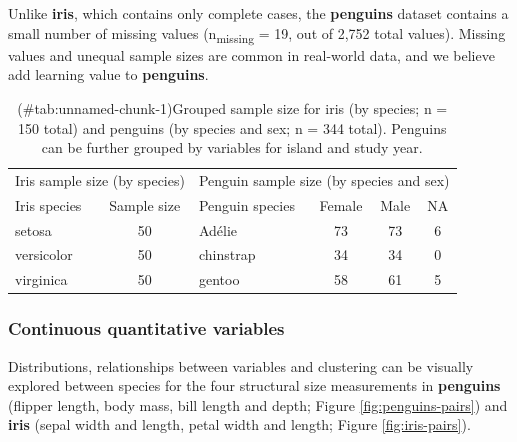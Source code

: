 Unlike \textbf{iris}, which contains only complete cases, the \textbf{penguins} dataset contains a small number of missing values (n\textsubscript{missing} = 19, out of 2,752 total values). Missing values and unequal sample sizes are common in real-world data, and we believe add learning value to \textbf{penguins}.

\begin{Schunk}
\begin{table}

\caption{(\#tab:unnamed-chunk-1)Grouped sample size for iris (by species; n = 150 total) and penguins (by species and sex; n = 344 total). Penguins can be further grouped by variables for island and study year.}
\centering
\begin{tabular}[t]{l|c|l|c|c|c}
\hline
\multicolumn{2}{c|}{Iris sample size (by species)} & \multicolumn{4}{c}{Penguin sample size (by species and sex)} \\
\cline{1-2} \cline{3-6}
Iris species & Sample size & Penguin species & Female & Male & NA\\
\hline
setosa & 50 & Adélie & 73 & 73 & 6\\
\hline
versicolor & 50 & chinstrap & 34 & 34 & 0\\
\hline
virginica & 50 & gentoo & 58 & 61 & 5\\
\hline
\end{tabular}
\end{table}

\end{Schunk}

\hypertarget{continuous-quantitative-variables}{%
\subsubsection{Continuous quantitative variables}\label{continuous-quantitative-variables}}

Distributions, relationships between variables and clustering can be visually explored between species for the four structural size measurements in \textbf{penguins} (flipper length, body mass, bill length and depth; Figure \ref{fig:penguins-pairs}) and \textbf{iris} (sepal width and length, petal width and length; Figure \ref{fig:iris-pairs}).

